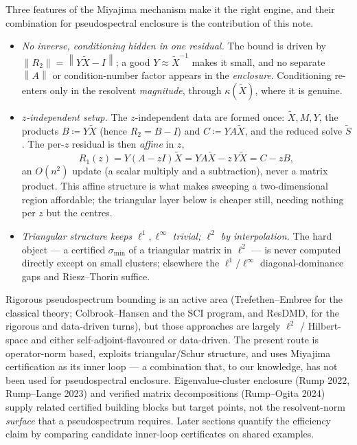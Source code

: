 \documentclass[11pt, a4paper]{article}
\numberwithin{equation}{section}
\newcommand{\norm}[1]{\left\|#1\right\|}
\newcommand{\tX}{\widetilde{X}}
\begin{document}
Three features of the Miyajima mechanism make it the right engine, and their
combination for pseudospectral enclosure is the contribution of this note.
\begin{itemize}
  \item \emph{No inverse, conditioning hidden in one residual.}  The bound is
    driven by $\norm{R_2} = \norm{Y\tX - I}$; a good $Y \approx \tX^{-1}$ makes
    it small, and no separate $\norm{A}$ or condition-number factor appears in
    the \emph{enclosure}.  Conditioning re-enters only in the resolvent
    \emph{magnitude}, through $\kappa(\tX)$, where it is genuine.
  \item \emph{$z$-independent setup.}  The $z$-independent data are formed once:
    $\tX, M, Y$, the products $B \coloneqq Y\tX$ (hence $R_2 = B - I$) and $C
    \coloneqq YA\tX$, and the reduced solve $\tilde S$.  The per-$z$ residual is
    then \emph{affine} in $z$,
    \[
      R_1(z) = Y(A - zI)\tX = YA\tX - z\,Y\tX = C - z B,
    \]
    an $O(n^2)$ update (a scalar multiply and a subtraction), never a matrix
    product.  This affine structure is what makes sweeping a two-dimensional
    region affordable; the triangular layer below is cheaper still, needing
    nothing per $z$ but the centres.
  \item \emph{Triangular structure keeps $\ell^1, \ell^\infty$ trivial; $\ell^2$
    by interpolation.}  The hard object --- a certified $\sigma_{\min}$ of a
    triangular matrix in $\ell^2$ --- is never computed directly except on small
    clusters; elsewhere the $\ell^1$/$\ell^\infty$ diagonal-dominance gaps and
    Riesz--Thorin suffice.
\end{itemize}
Rigorous pseudospectrum bounding is an active area (Trefethen--Embree for the
classical theory; Colbrook--Hansen and the SCI program, and ResDMD, for the
rigorous and data-driven turns), but those approaches are largely $\ell^2$ /
Hilbert-space and either self-adjoint-flavoured or data-driven.  The present
route is operator-norm based, exploits triangular/Schur structure, and uses
Miyajima certification as its inner loop --- a combination that, to our
knowledge, has not been used for pseudospectral enclosure.  Eigenvalue-cluster
enclosure (Rump 2022, Rump--Lange 2023) and verified matrix decompositions
(Rump--Ogita 2024) supply related certified building blocks but target
points, not the resolvent-norm \emph{surface} that a pseudospectrum requires.
Later sections quantify the efficiency claim by comparing candidate inner-loop
certificates on shared examples.
\end{document}
